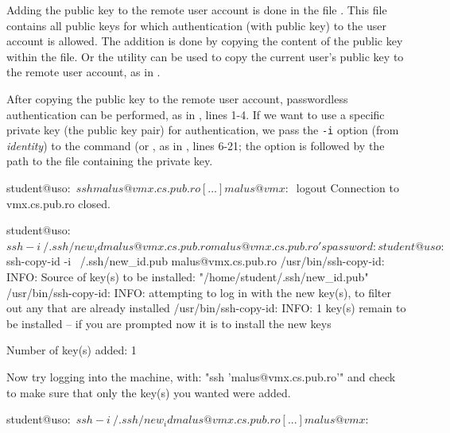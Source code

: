 Adding the public key to the remote user account is done in the file .
This file contains all public keys for which authentication (with public key) to the user account is allowed.
The addition is done by copying the content of the public key within the file.
Or the  utility can be used to copy the current user's public key to the remote user account, as in .


After copying the public key to the remote user account, passwordless authentication can be performed, as in , lines 1-4.
If we want to use a specific private key (the public key pair) for authentication, we pass the \texttt{-i} option (from \textit{identity}) to the  command (or , as in , lines 6-21;
the option is followed by the path to the file containing the private key.

\begin{screen}[caption={SSH authentication with public key},label={lst:sec:ssh-pub-auth}]
student@uso:~$ ssh malus@vmx.cs.pub.ro
[...]
malus@vmx:~$ logout
Connection to vmx.cs.pub.ro closed.

student@uso:~$ ssh -i ~/.ssh/new_id malus@vmx.cs.pub.ro
malus@vmx.cs.pub.ro's password:

student@uso:~$ ssh-copy-id -i ~/.ssh/new_id.pub malus@vmx.cs.pub.ro
/usr/bin/ssh-copy-id: INFO: Source of key(s) to be installed: "/home/student/.ssh/new_id.pub"
/usr/bin/ssh-copy-id: INFO: attempting to log in with the new key(s), to filter out any that are already installed
/usr/bin/ssh-copy-id: INFO: 1 key(s) remain to be installed -- if you are prompted now it is to install the new keys

Number of key(s) added: 1

Now try logging into the machine, with:   "ssh 'malus@vmx.cs.pub.ro'"
and check to make sure that only the key(s) you wanted were added.

student@uso:~$ ssh -i ~/.ssh/new_id malus@vmx.cs.pub.ro
[...]
malus@vmx:~$
\end{screen}

